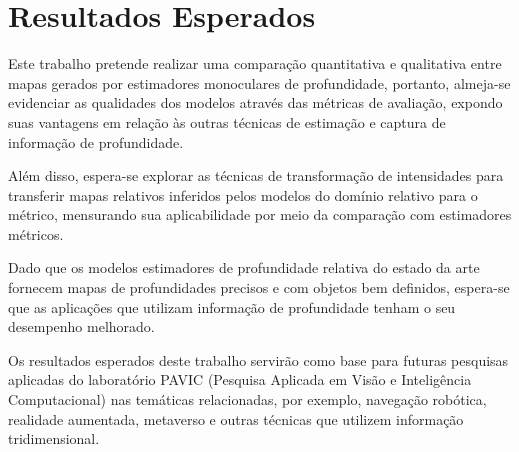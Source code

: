 \section{Resultados Esperados}

Este trabalho pretende realizar uma comparação quantitativa e qualitativa entre mapas gerados por estimadores monoculares de profundidade, portanto, almeja-se evidenciar as qualidades dos modelos através das métricas de avaliação, expondo suas vantagens em relação às outras técnicas de estimação e captura de informação de profundidade. 

Além disso, espera-se explorar as técnicas de transformação de intensidades para transferir mapas relativos inferidos pelos modelos do domínio relativo para o métrico, mensurando sua aplicabilidade por meio da comparação com estimadores métricos. 

Dado que os modelos estimadores de profundidade relativa do estado da arte fornecem mapas de profundidades precisos e com objetos bem definidos, espera-se que as aplicações que utilizam informação de profundidade tenham o seu desempenho melhorado. 

Os resultados esperados deste trabalho servirão como base para futuras pesquisas aplicadas do laboratório PAVIC (Pesquisa Aplicada em Visão e Inteligência Computacional) nas temáticas relacionadas, por exemplo, navegação robótica, realidade aumentada, metaverso e outras técnicas que utilizem informação tridimensional.